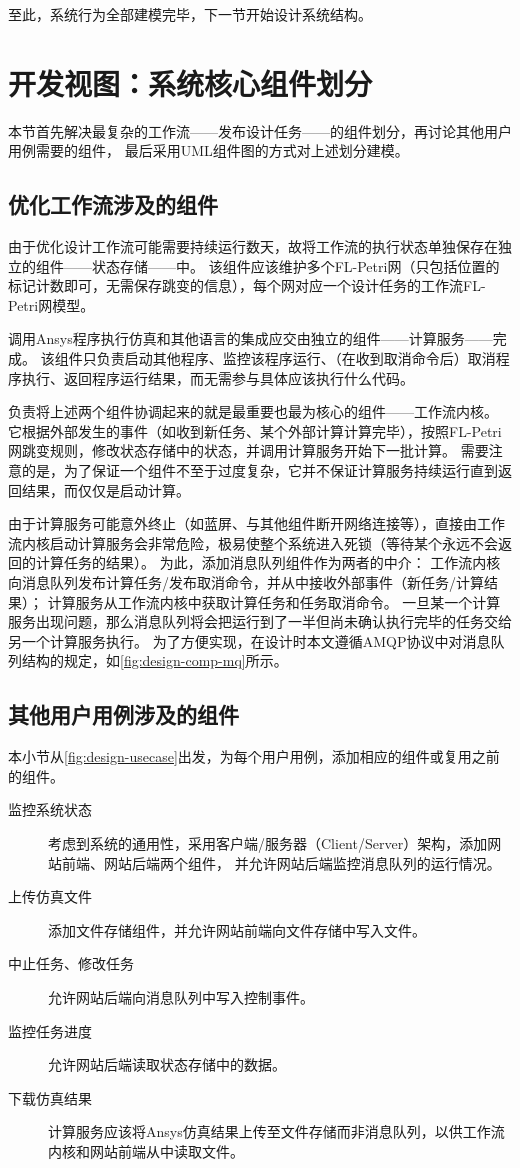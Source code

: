 \documentclass[index]{subfiles}
\begin{document}
至此，系统行为全部建模完毕，下一节开始设计系统结构。

\section{开发视图：系统核心组件划分}\label{sec:design-comp}
本节首先解决最复杂的工作流——发布设计任务——的组件划分，再讨论其他用户用例需要的组件，
最后采用UML组件图的方式对上述划分建模。

\subsection{优化工作流涉及的组件}\label{ssec:design-wf}
由于优化设计工作流可能需要持续运行数天，故将工作流的执行状态单独保存在独立的组件——状态存储——中。
该组件应该维护多个FL-Petri网（只包括位置的标记计数即可，无需保存跳变的信息），每个网对应一个设计任务的工作流FL-Petri网模型。

调用Ansys程序执行仿真和其他语言的集成应交由独立的组件——计算服务——完成。
该组件只负责启动其他程序、监控该程序运行、（在收到取消命令后）取消程序执行、返回程序运行结果，而无需参与具体应该执行什么代码。

负责将上述两个组件协调起来的就是最重要也最为核心的组件——工作流内核。
它根据外部发生的事件（如收到新任务、某个外部计算计算完毕），按照FL-Petri网跳变规则，修改状态存储中的状态，并调用计算服务开始下一批计算。
需要注意的是，为了保证一个组件不至于过度复杂，它并不保证计算服务持续运行直到返回结果，而仅仅是启动计算。

由于计算服务可能意外终止（如蓝屏、与其他组件断开网络连接等），直接由工作流内核启动计算服务会非常危险，极易使整个系统进入死锁（等待某个永远不会返回的计算任务的结果）。
为此，添加消息队列组件作为两者的中介：
工作流内核向消息队列发布计算任务/发布取消命令，并从中接收外部事件（新任务/计算结果）；
计算服务从工作流内核中获取计算任务和任务取消命令。
一旦某一个计算服务出现问题，那么消息队列将会把运行到了一半但尚未确认执行完毕的任务交给另一个计算服务执行。
为了方便实现，在设计时本文遵循AMQP协议中对消息队列结构的规定，如\cref{fig:design-comp-mq}所示。

\subsection{其他用户用例涉及的组件}
本小节从\cref{fig:design-usecase}出发，为每个用户用例，添加相应的组件或复用之前的组件。
\begin{description}
  \item[监控系统状态] 考虑到系统的通用性，采用客户端/服务器（Client/Server）架构，添加网站前端、网站后端两个组件，
    并允许网站后端监控消息队列的运行情况。
  \item[上传仿真文件] 添加文件存储组件，并允许网站前端向文件存储中写入文件。
  \item[中止任务、修改任务] 允许网站后端向消息队列中写入控制事件。
  \item[监控任务进度] 允许网站后端读取状态存储中的数据。
  \item[下载仿真结果] 计算服务应该将Ansys仿真结果上传至文件存储而非消息队列，以供工作流内核和网站前端从中读取文件。
\end{description}
\end{document}
